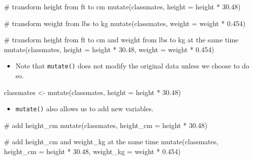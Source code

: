 \documentclass[
  letterpaper,
  DIV=11,
  numbers=noendperiod]{scrreprt}
\newenvironment{Shaded}{\begin{snugshade}}{\end{snugshade}}
\newcommand{\AttributeTok}[1]{\textcolor[rgb]{0.40,0.45,0.13}{#1}}
\newcommand{\CommentTok}[1]{\textcolor[rgb]{0.37,0.37,0.37}{#1}}
\newcommand{\FloatTok}[1]{\textcolor[rgb]{0.68,0.00,0.00}{#1}}
\newcommand{\FunctionTok}[1]{\textcolor[rgb]{0.28,0.35,0.67}{#1}}
\newcommand{\NormalTok}[1]{\textcolor[rgb]{0.00,0.23,0.31}{#1}}
\newcommand{\OtherTok}[1]{\textcolor[rgb]{0.00,0.23,0.31}{#1}}
\newcommand{\SpecialCharTok}[1]{\textcolor[rgb]{0.37,0.37,0.37}{#1}}
\providecommand{\tightlist}{%
  \setlength{\itemsep}{0pt}\setlength{\parskip}{0pt}}\usepackage{longtable,booktabs,array}
\begin{document}
\begin{Shaded}
\begin{Highlighting}[]
\CommentTok{\# transform height from ft to cm}
\FunctionTok{mutate}\NormalTok{(classmates, }\AttributeTok{height =}\NormalTok{ height }\SpecialCharTok{*} \FloatTok{30.48}\NormalTok{)}

\CommentTok{\# transform weight from lbs to kg}
\FunctionTok{mutate}\NormalTok{(classmates, }\AttributeTok{weight =}\NormalTok{ weight }\SpecialCharTok{*} \FloatTok{0.454}\NormalTok{)}

\CommentTok{\# transform height from ft to cm and weight from lbs to kg at the same time}
\FunctionTok{mutate}\NormalTok{(classmates, }\AttributeTok{height =}\NormalTok{ height }\SpecialCharTok{*} \FloatTok{30.48}\NormalTok{, }\AttributeTok{weight =}\NormalTok{ weight }\SpecialCharTok{*} \FloatTok{0.454}\NormalTok{)}
\end{Highlighting}
\end{Shaded}

\begin{itemize}
\tightlist
\item
  Note that \texttt{mutate()} does not modify the original data unless
  we choose to do so.
\end{itemize}

\begin{Shaded}
\begin{Highlighting}[]
\NormalTok{classmates }\OtherTok{\textless{}{-}} \FunctionTok{mutate}\NormalTok{(classmates, }\AttributeTok{height =}\NormalTok{ height }\SpecialCharTok{*} \FloatTok{30.48}\NormalTok{)}
\end{Highlighting}
\end{Shaded}

\begin{itemize}
\tightlist
\item
  \texttt{mutate()} also allows us to add new variables.
\end{itemize}

\begin{Shaded}
\begin{Highlighting}[]
\CommentTok{\# add height\_cm}
\FunctionTok{mutate}\NormalTok{(classmates, }\AttributeTok{height\_cm =}\NormalTok{ height }\SpecialCharTok{*} \FloatTok{30.48}\NormalTok{)}

\CommentTok{\# add height\_cm and weight\_kg at the same time}
\FunctionTok{mutate}\NormalTok{(classmates, }\AttributeTok{height\_cm =}\NormalTok{ height }\SpecialCharTok{*} \FloatTok{30.48}\NormalTok{, }\AttributeTok{weight\_kg =}\NormalTok{ weight }\SpecialCharTok{*} \FloatTok{0.454}\NormalTok{)}
\end{Highlighting}
\end{Shaded}
\end{document}
